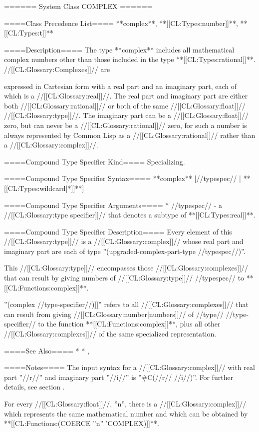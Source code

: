 ====== System Class COMPLEX ======

====Class Precedence List==== 
**complex**, **[[CL:Types:number]]**, **[[CL:Types:t]]**

====Description====
The type **complex** includes all mathematical complex numbers other than those included in the type **[[CL:Types:rational]]**. //[[CL:Glossary:Complexes]]// are

expressed in Cartesian form with a real part and an imaginary part, each of which is a //[[CL:Glossary:real]]//. The real part and imaginary part are either both //[[CL:Glossary:rational]]// or both of the same //[[CL:Glossary:float]]// //[[CL:Glossary:type]]//. The imaginary part can be a //[[CL:Glossary:float]]// zero, but can never be a //[[CL:Glossary:rational]]// zero, for such a number is always represented by Common Lisp as a //[[CL:Glossary:rational]]// rather than a //[[CL:Glossary:complex]]//.

====Compound Type Specifier Kind====
Specializing.

====Compound Type Specifier Syntax====
**complex** [//typespec// | **[[CL:Types:wildcard|*]]**]

====Compound Type Specifier Arguments====
  * //typespec// - a //[[CL:Glossary:type specifier]]// that denotes a subtype of **[[CL:Types:real]]**.

====Compound Type Specifier Description====
Every element of this //[[CL:Glossary:type]]// is a //[[CL:Glossary:complex]]// whose real part and imaginary part are each of type ''(upgraded-complex-part-type //typespec//)''.

This //[[CL:Glossary:type]]// encompasses those //[[CL:Glossary:complexes]]// that can result by giving numbers of //[[CL:Glossary:type]]// //typespec// to **[[CL:Functions:complex]]**.

''(complex //type-specifier//)]]'' refers to all //[[CL:Glossary:complexes]]// that can result from giving //[[CL:Glossary:number|numbers]]// of //type// //type-specifier// to the function **[[CL:Functions:complex]]**, plus all other //[[CL:Glossary:complexes]]// of the same specialized representation.

====See Also====
  * {\secref\RuleOfCanonRepForComplexRationals}
  * {\secref\NumsFromTokens}, {\secref\PrintingComplexes}

====Notes====
The input syntax for a //[[CL:Glossary:complex]]// with real part ''//r//'' and imaginary part ''//i//'' is ''#C(//r// //i//)''. For further details, see section {\secref\StandardMacroChars}.

For every //[[CL:Glossary:float]]//, ''n'', there is a //[[CL:Glossary:complex]]// which represents the same mathematical number and which can be obtained by **[[CL:Functions:(COERCE ''n'' 'COMPLEX)]]**.

 

